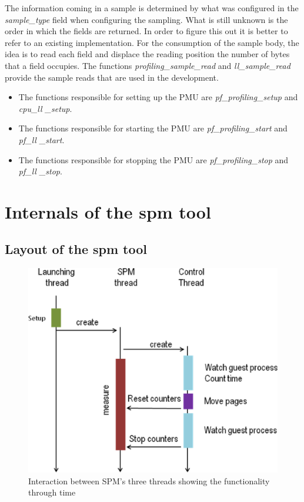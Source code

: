 The information coming in a sample is determined by what was configured in the \textit{sample\_type} field when configuring the sampling. What is still unknown is the order in which the fields are returned. In order to figure this out it is better to refer to an existing implementation. For the consumption of the sample body, the idea is to read each field and displace the reading position the number of bytes that a field occupies. The functions \textit{profiling\_sample\_read} and \textit{ll\_sample\_read} provide the sample reads that are used in the development. 


\begin{itemize}
	\item The functions responsible for setting up the PMU are \textit{pf\_profiling\_setup} and \textit{cpu\_ll \_setup}.
	\item The functions responsible for starting the PMU are \textit{pf\_profiling\_start} and \textit{pf\_ll \_start}. 
	\item The functions responsible for stopping the PMU are \textit{pf\_profiling\_stop} and \textit{pf\_ll \_stop}.
\end{itemize}
  
\section{Internals of the spm tool}\label{section:spminternals}

\subsection{Layout of the spm tool }\label{subsection:main-layout}
\begin{figure}[h]
	\centering
		\includegraphics[width=.9\textwidth]{figures/sequence.eps}
		\caption[Timing and threads in the execution of the SPM tool]{Interaction between SPM's three threads showing the functionality through time}
		\label{fig:sol-seq}
\end{figure}

